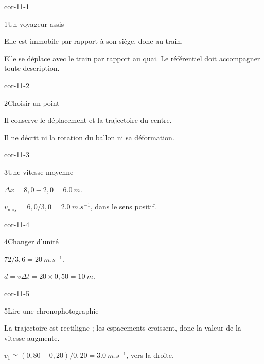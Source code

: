 \clearpage{}
\corrigesSouples
\begin{blocLivre}{cor-11-1}\begin{corrige}{1}{Un voyageur assis}
\begin{questions}
\item Elle est immobile par rapport à son siège, donc au train.
\item Elle se déplace avec le train par rapport au quai. Le référentiel doit accompagner toute description.
\end{questions}
\end{corrige}\end{blocLivre}
\begin{blocLivre}{cor-11-2}\begin{corrige}{2}{Choisir un point}
\begin{questions}
\item Il conserve le déplacement et la trajectoire du centre.
\item Il ne décrit ni la rotation du ballon ni sa déformation.
\end{questions}
\end{corrige}\end{blocLivre}
\begin{blocLivre}{cor-11-3}\begin{corrige}{3}{Une vitesse moyenne}
\begin{questions}
\item $\Delta x=8,0-2,0=\qty{6,0}{m}$.
\item $v_{\mathrm{moy}}=6,0/3,0=\qty{2,0}{m.s^{-1}}$, dans le sens positif.
\end{questions}
\end{corrige}\end{blocLivre}
\begin{blocLivre}{cor-11-4}\begin{corrige}{4}{Changer d’unité}
\begin{questions}
\item $72/3,6=\qty{20}{m.s^{-1}}$.
\item $d=v\Delta t=20\times0,50=\qty{10}{m}$.
\end{questions}
\end{corrige}\end{blocLivre}
\begin{blocLivre}{cor-11-5}\begin{corrige}{5}{Lire une chronophotographie}
\begin{questions}
\item La trajectoire est rectiligne ; les espacements croissent, donc la valeur de la vitesse augmente.
\item $v_1\simeq(0,80-0,20)/0,20=\qty{3,0}{m.s^{-1}}$, vers la droite.
\end{questions}
\end{corrige}\end{blocLivre}
